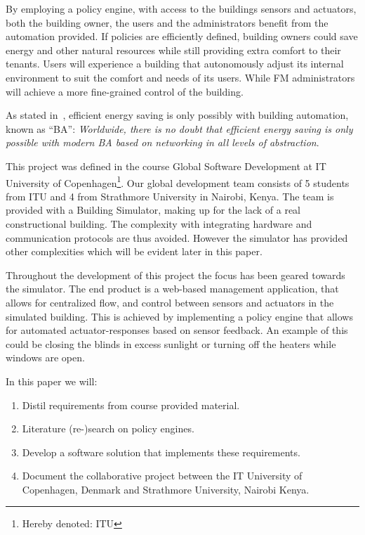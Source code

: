 By employing a policy engine, with access to the buildings sensors and actuators, both the building owner, the users and the administrators benefit from the automation provided. If policies are efficiently defined, building owners could save energy and other natural resources while still providing extra comfort to their tenants. Users will experience a building that autonomously adjust its internal environment to suit the comfort and needs of its users. While FM administrators will achieve a more fine-grained control of the building.

As stated in~\cite{ba-short}, efficient energy saving is only possibly with building automation, known as ``BA'': \textit{Worldwide, there is no doubt that efficient energy saving is only possible with modern BA based on networking in all levels of abstraction}.

This project was defined in the course Global Software Development at IT University of Copenhagen\footnote{Hereby denoted: ITU}. Our global development team consists of 5 students from ITU and 4 from Strathmore University in Nairobi, Kenya. The team is provided with a Building Simulator, making up for the lack of a real constructional building. The complexity with integrating hardware and communication protocols are thus avoided. However the simulator has provided other complexities which will be evident later in this paper. 

Throughout the development of this project the focus has been geared towards the simulator. The end product is a web-based management application, that allows for centralized flow, and control between sensors and actuators in the simulated building. This is achieved by implementing a policy engine that allows for automated actuator-responses based on sensor feedback. An example of this could be closing the blinds in excess sunlight or turning off the heaters while windows are open.

In this paper we will: 
\begin{enumerate}
	\item Distil requirements from course provided material.
	\item Literature (re-)search on policy engines.
	\item Develop a software solution that implements these requirements.
	\item Document the collaborative project between the IT University of Copenhagen, Denmark and Strathmore University, Nairobi Kenya.
\end{enumerate}


